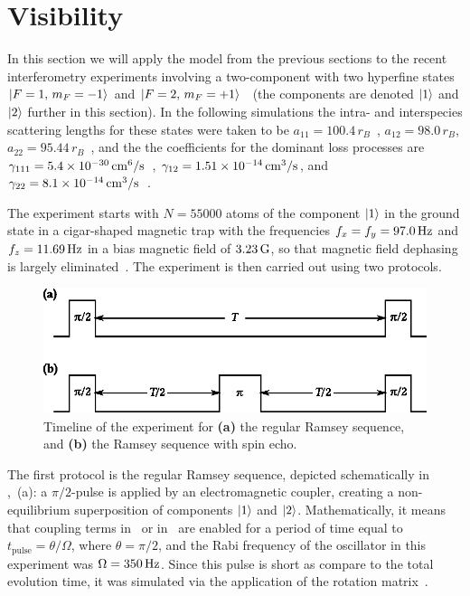 \section{Visibility}

In this section we will apply the model from the previous sections to the recent interferometry experiments involving a two-component \Rb{}  with two hyperfine states ${\mbox{\ensuremath{\vert F=1,\, m_F=-1 \rangle}}}$ and ${\mbox{\ensuremath{\vert F=2,\, m_F=+1 \rangle}}}$~\cite{Egorov2011} (the components are denoted $\mbox{\ensuremath{\vert 1 \rangle}}$ and $\mbox{\ensuremath{\vert 2 \rangle}}$ further in this section).
In the following simulations the intra- and interspecies scattering lengths for these states were taken to be $a_{11} = 100.4\,r_B$~\cite{Widera2006,Mertes2007}, $a_{12} = 98.0\,r_B$, $a_{22} = 95.44\,r_B$~\cite{Egorov2013}, and the the coefficients for the dominant loss processes are $\gamma_{111} = 5.4 \times 10^{-30} \mbox{\ensuremath{\,\mathrm{cm^6/s}}}$~\cite{Mertes2007}, $\gamma_{12} = 1.51 \times 10^{-14}\mbox{\ensuremath{\,\mathrm{cm^3/s}}}$, and $\gamma_{22} = 8.1 \times 10^{-14} \mbox{\ensuremath{\,\mathrm{cm^3/s}}}$~\cite{Egorov2013}.

The experiment starts with $N = 55000$ atoms of the component $\mbox{\ensuremath{\vert 1 \rangle}}$ in the ground state in a cigar-shaped magnetic trap with the frequencies $f_x = f_y = 97.0\mbox{\ensuremath{\,\mathrm{Hz}}}$ and $f_z = 11.69\mbox{\ensuremath{\,\mathrm{Hz}}}$ in a bias magnetic field of $3.23\mbox{\ensuremath{\,\mathrm{G}}}$, so that magnetic field dephasing is largely eliminated~\cite{Hall1998}.
The experiment is then carried out using two protocols.

\begin{figure}
    \centerline{\includegraphics{figures_precreated/sequences.eps}}
    \caption{
    Timeline of the experiment for \textbf{(a)} the regular Ramsey sequence, and \textbf{(b)} the Ramsey sequence with spin echo.}
    \label{fig:bec-noise:visibility:sequences}
\end{figure}

The first protocol is the regular Ramsey sequence, depicted schematically in ,~(a): a $\pi/2$-pulse is applied by an electromagnetic coupler, creating a non-equilibrium superposition of components $\mbox{\ensuremath{\vert 1 \rangle}}$ and $\mbox{\ensuremath{\vert 2 \rangle}}$.
Mathematically, it means that coupling terms in~ or in~ are enabled for a period of time equal to $t_{\mathrm{pulse}} = \theta / \Omega$, where $\theta = \pi/2$, and the Rabi frequency of the oscillator in this experiment was $\Omega = 350\mbox{\ensuremath{\,\mathrm{Hz}}}$.
Since this pulse is short as compare to the total evolution time, it was simulated via the application of the rotation matrix~.

